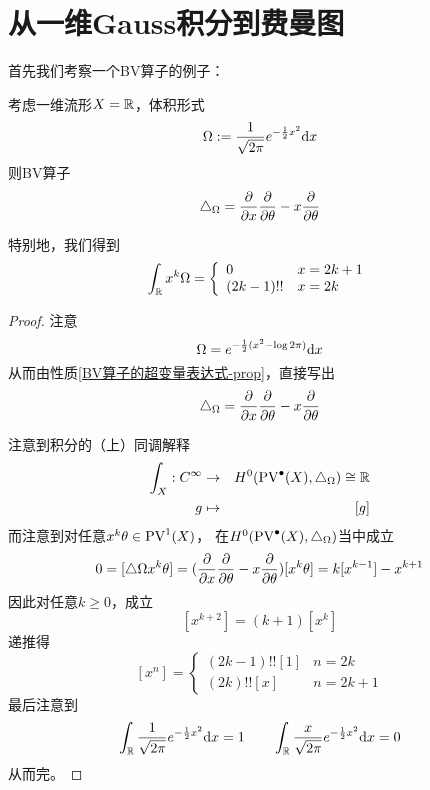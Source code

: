 \section{从一维Gauss积分到费曼图}
首先我们考察一个BV算子的例子：
\begin{Example}
考虑一维流形$X=\mathbb{R}$，体积形式
$$\Omega:=\frac{1}{\sqrt{2\pi}}e^{-\frac{1}{2}x^2}\mathrm{d} x$$
则BV算子
$$\triangle_{\Omega}=\frac{\partial } {\partial x}\frac{\partial } {\partial \theta}-x\frac{\partial } {\partial \theta}$$

特别地，我们得到
$$
  \int_{\mathbb{R}} x^k\Omega
=
  \left\{
    \begin{array}{ll}
      0          &  x=2k+1\\
      (2k-1)!!   &  x=2k
    \end{array}
  \right.
$$
\end{Example}

\begin{proof}
注意
$$\Omega=e^{-\frac{1}{2}(x^2-\log 2\pi)}\mathrm{d} x$$
从而由性质\ref{BV算子的超变量表达式-prop}，直接写出
$$\triangle_{\Omega}=\frac{\partial } {\partial x}\frac{\partial } {\partial \theta}-x\frac{\partial } {\partial \theta}$$

注意到积分的（上）同调解释
\begin{eqnarray*}
  \int_X:C^{\infty}&\to& H^0(\operatorname{PV}^{\bullet}(X),\triangle_\Omega)\cong\mathbb{R}\\
  g&\mapsto& [g]
\end{eqnarray*}
而注意到对任意$x^k\theta\in \operatorname{PV}^1(X)$，
在$H^0(\operatorname{PV}^{\bullet}(X),\triangle_\Omega)$当中成立
$$0=[\triangle\Omega x^k\theta]=(\frac{\partial } {\partial x}\frac{\partial } {\partial \theta}-x\frac{\partial } {\partial \theta})[x^k\theta]
=k[x^{k-1}]-x^{k+1}$$
因此对任意$k\geq 0$，成立
$$[x^{k+2}]=(k+1)[x^k]$$
递推得
$$
  [x^n]=
  \left\{
    \begin{array}{ll}
      (2k-1)!![1]  & n=2k\\
      (2k)!![x]    & n=2k+1
    \end{array}
  \right.
$$
最后注意到
\begin{eqnarray*}
\int_{\mathbb{R}}
  \frac{1}{\sqrt{2\pi}}
  e^{-\frac{1}{2}x^2}\mathrm{d} x=1\qquad
\int_{\mathbb{R}}
  \frac{x}{\sqrt{2\pi}}
  e^{-\frac{1}{2}x^2}\mathrm{d} x=0
\end{eqnarray*}
从而完。
\end{proof}

